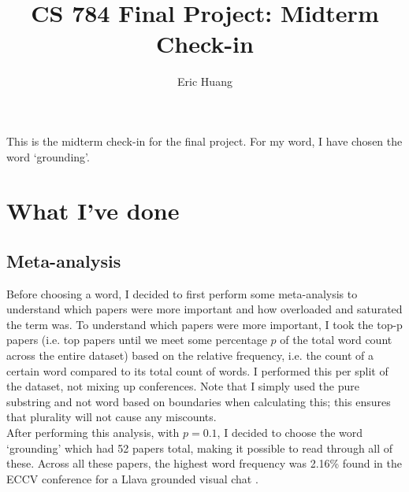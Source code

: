 \documentclass[12pt, letterpaper]{article}
\begin{document}
\title{CS 784 Final Project: Midterm Check-in}
\author{Eric Huang}
\maketitle

This is the midterm check-in for the final project. For my word, I have chosen the word `grounding'.

\section{What I've done}
\subsection{Meta-analysis}
Before choosing a word, I decided to first perform some meta-analysis to understand which papers were more important and how overloaded and saturated the term was. To understand which papers were more important, I took the top-p papers (i.e. top papers until we meet some percentage $p$ of the total word count across the entire dataset) based on the relative frequency, i.e. the count of a certain word compared to its total count of words. I performed this per split of the dataset, not mixing up conferences. Note that I simply used the pure substring and not word based on boundaries when calculating this; this ensures that plurality will not cause any miscounts.\\

After performing this analysis, with $p = 0.1$, I decided to choose the word `grounding' which had 52 papers total, making it possible to read through all of these. Across all these papers, the highest word frequency was 2.16\% found in the ECCV conference for a Llava grounded visual chat \cite{zhang2023llavagroundinggroundedvisualchat}.
\end{document}
